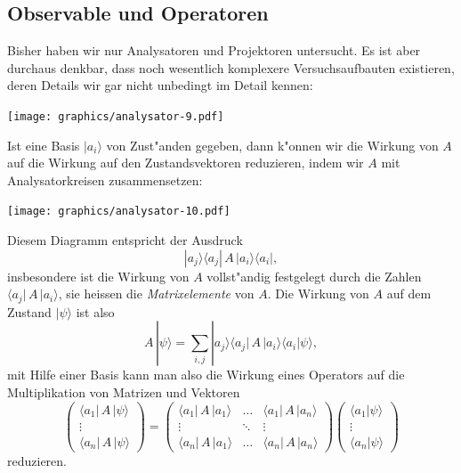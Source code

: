 \subsection{Observable und Operatoren}
%
Bisher haben wir nur Analysatoren und Projektoren untersucht.
Es ist aber durchaus denkbar, dass noch wesentlich komplexere
Versuchsaufbauten existieren, deren Details wir gar nicht unbedingt
im Detail kennen:
\begin{center}
\texttt{[image: graphics/analysator-9.pdf]}
\end{center}
Ist eine Basis $|a_i\rangle$ von Zust"anden gegeben, dann k"onnen
wir die Wirkung von $A$ auf die Wirkung auf den Zustandsvektoren
reduzieren, indem wir $A$ mit Analysatorkreisen zusammensetzen:
\begin{center}
\texttt{[image: graphics/analysator-10.pdf]}
\end{center}
Diesem Diagramm entspricht der Ausdruck
\[
|a_j\rangle \langle a_j|\, A \,|a_i\rangle \langle a_i|,
\]
insbesondere ist die Wirkung von $A$ vollst"andig festgelegt durch die
Zahlen
$\langle a_j|\,A\,|a_i\rangle$, sie heissen die {\em Matrixelemente} von $A$.
%
Die Wirkung von $A$ auf dem Zustand $|\psi\rangle$ ist also
\begin{equation}
A\,|\psi\rangle = \sum_{i,j} |a_j\rangle
	\langle a_j|\,A\,|a_i\rangle
	\langle a_i|\psi\rangle,
\label{skript:A-wirkung}
\end{equation}
mit Hilfe einer Basis kann man also die Wirkung eines Operators auf
die Multiplikation von Matrizen und Vektoren
\[
\begin{pmatrix}
\langle a_1|\,A\,|\psi\rangle\\
\vdots\\
\langle a_n|\,A\,|\psi\rangle
\end{pmatrix}
=
\begin{pmatrix}
\langle a_1|\,A\,|a_1\rangle&\dots &\langle a_1|\,A\,|a_n\rangle\\
\vdots                  &\ddots&\vdots                  \\
\langle a_n|\,A\,|a_1\rangle&\dots &\langle a_n|\,A\,|a_n\rangle
\end{pmatrix}
\begin{pmatrix}
\langle a_1|\psi\rangle\\
\vdots\\
\langle a_n|\psi\rangle
\end{pmatrix}
\]
reduzieren.

